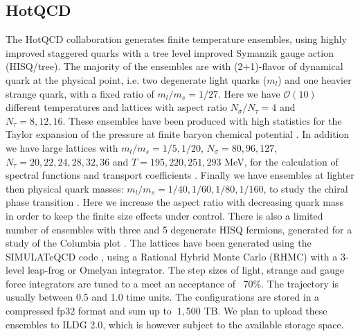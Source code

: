 \documentclass[a4paper,11pt]{article}
\begin{document}
\subsection{HotQCD}
The HotQCD collaboration generates finite temperature ensembles, using
highly improved staggered quarks with a tree level improved Symanzik
gauge action (HISQ/tree). The majority of the ensembles are with
(2+1)-flavor of dynamical quark at the physical point, i.e. two
degenerate light quarks ($m_l$) and one heavier strange quark, with a
fixed ratio of $m_l/m_s=1/27$. Here we have $\mathcal{O}(10)$
different temperatures and lattices with aspect ratio
$N_\sigma/N_\tau=4$ and $N_\tau=8,12,16$. These ensembles have been
produced with high statistics for the Taylor expansion of the pressure
at finite baryon chemical potential \cite{Bollweg:2021vqf,
  Bollweg:2022fqq}. In addition we have large lattices with
$m_l/m_s=1/5, 1/20$, $N_\sigma=80,96,127$, $N_\tau=20,22,24,28,32,36$
and $T=195, 220, 251, 293$ MeV, for the calculation of spectral
functions and transport coefficients
\cite{Altenkort:2023eav,Altenkort:2023oms}. Finally we have ensembles
at lighter then physical quark masses: $m_l/m_s=1/40,1/60,1/80,1/160$,
to study the chiral phase transition \cite{Ding:2024sux,
  HotQCD:2019xnw}. Here we increase the aspect ratio with decreasing
quark mass in order to keep the finite size effects under
control. There is also a limited number of ensembles with three and 5
degenerate HISQ fermions, generated for a study of the Columbia plot
\cite{Dini:2021hug,Karsch:2022yka}.  The lattices have been generated
using the SIMULATeQCD code \cite{HotQCD:2023ghu}, using a Rational
Hybrid Monte Carlo (RHMC) with a 3-level leap-frog or Omelyan
integrator. The step sizes of light, strange and gauge force
integrators are tuned to a meet an acceptance of ~70\%. The trajectory
is usually between 0.5 and 1.0 time units. The configurations are
stored in a compressed fp32 format and sum up to $~1,500$ TB. We plan
to upload these ensembles to ILDG 2.0, which is however subject to the
available storage space.

\end{document}
